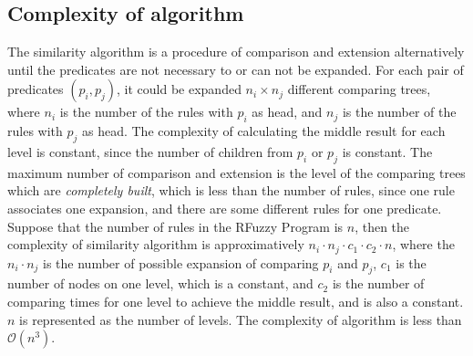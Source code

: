 \subsection{Complexity of algorithm}
\label{sec:Complexity}
The similarity algorithm is a procedure of comparison and extension alternatively until the predicates are not necessary to or can not be expanded. For each pair of predicates $(p_i,p_j)$, it could be expanded $n_i \times n_j$ different comparing trees, where $n_i$ is the number of the rules with $p_i$ as head, and $n_j$ is the number of the rules with $p_j$ as head. The complexity of calculating the middle result for each level is
constant, since the number of children from $p_i$ or $p_j$ is constant.
The maximum number of comparison and extension is the level of the comparing trees which are \textit{completely built}, which is less than the number of rules, since one rule associates one expansion, and there are some different rules for one predicate. Suppose that the number of rules in the RFuzzy Program is $n$, then the complexity of similarity algorithm is approximatively $n_i \cdot n_j \cdot c_1 \cdot c_2 \cdot n$, where the $n_i
\cdot n_j$ is the number of possible expansion of comparing $p_i$ and $p_j$, $c_1$ is the number of nodes on one level, which is a constant, and $c_2$ is the number of comparing times for one level to achieve the middle result, and is also a constant. $n$ is represented as the number of levels. The complexity of algorithm is less than $\mathcal{O}(n^3)$.